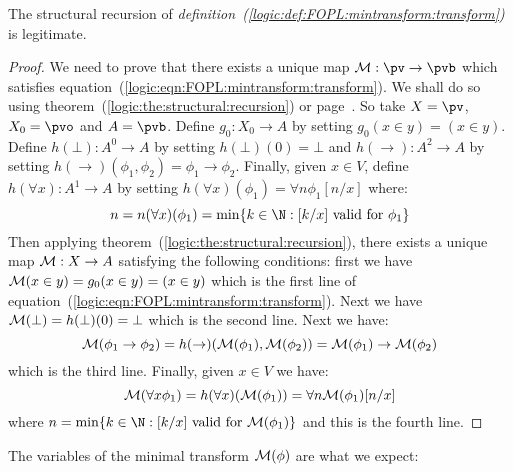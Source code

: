 \begin{prop}\label{logic:prop:FOPL:mintransform:recursion}
The structural recursion of {\em
definition~(\ref{logic:def:FOPL:mintransform:transform})} is
legitimate.
\end{prop}
\begin{proof}
We need to prove that there exists a unique map ${\cal
M}:\pv\to\pvb$ which satisfies
equation~(\ref{logic:eqn:FOPL:mintransform:transform}). We shall do
so using theorem~(\ref{logic:the:structural:recursion}) or
page~\pageref{logic:the:structural:recursion}. So take $X=\pv$,
$X_{0}=\pvo$ and $A=\pvb$. Define $g_{0}:X_{0}\to A$ by setting
$g_{0}(x\in y)=(x\in y)$. Define $h(\bot):A^{0}\to A$ by setting
$h(\bot)(0)=\bot$ and $h(\to):A^{2}\to A$ by setting
$h(\to)(\phi_{1},\phi_{2})= \phi_{1}\to\phi_{2}$. Finally, given
$x\in V$, define $h(\forall x):A^{1}\to A$ by setting $h(\forall
x)(\phi_{1})=\forall n\phi_{1}[n/x]$ where:
    \[
    n=n(\forall
    x)(\phi_{1})=\min\{k\in\N:\mbox{$[k/x]$ valid for
    $\phi_{1}$}\}
    \]
Then applying theorem~(\ref{logic:the:structural:recursion}), there
exists a unique map ${\cal M}:X\to A$ satisfying the following
conditions: first we have ${\cal M}(x\in y)=g_{0}(x\in y)=(x\in y)$
which is the first line of
equation~(\ref{logic:eqn:FOPL:mintransform:transform}). Next we have
${\cal M}(\bot) =h(\bot)(0) = \bot$ which is the second line. Next
we have:
     \[
     {\cal M}(\phi_{1}\to\phi_{2})=h(\to)({\cal
    M}(\phi_{1}),{\cal M}(\phi_{2}))={\cal M}(\phi_{1})\to{\cal
    M}(\phi_{2})
    \]
which is the third line. Finally, given $x\in V$ we have:
    \[
    {\cal M}(\forall x\phi_{1})=h(\forall x)({\cal M}(\phi_{1}))=\forall n{\cal M}(\phi_{1})[n/x]
    \]
where $n=\min\{k\in\N:\mbox{$[k/x]$ valid for
    ${\cal M}(\phi_{1})$}\}$ and this is the fourth line.
\end{proof}

The variables of the minimal transform ${\cal M}(\phi)$ are what we
expect:

